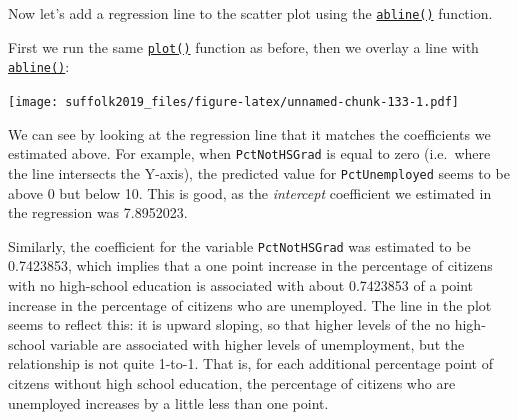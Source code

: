 \documentclass[]{article}
\newenvironment{Shaded}{\begin{snugshade}}{\end{snugshade}}
\newcommand{\DataTypeTok}[1]{\textcolor[rgb]{0.13,0.29,0.53}{#1}}
\newcommand{\DecValTok}[1]{\textcolor[rgb]{0.00,0.00,0.81}{#1}}
\newcommand{\KeywordTok}[1]{\textcolor[rgb]{0.13,0.29,0.53}{\textbf{#1}}}
\newcommand{\NormalTok}[1]{#1}
\newcommand{\OperatorTok}[1]{\textcolor[rgb]{0.81,0.36,0.00}{\textbf{#1}}}
\newcommand{\OtherTok}[1]{\textcolor[rgb]{0.56,0.35,0.01}{#1}}
\newcommand{\StringTok}[1]{\textcolor[rgb]{0.31,0.60,0.02}{#1}}
\begin{document}
Now let's add a regression line to the scatter plot using the \href{http://bit.ly/R_abline}{\texttt{abline()}} function.

First we run the same \href{http://bit.ly/R_plot}{\texttt{plot()}} function as before, then we overlay a line with \href{http://bit.ly/R_abline}{\texttt{abline()}}:

\begin{Shaded}
\end{Shaded}

\texttt{[image: suffolk2019\_files/figure-latex/unnamed-chunk-133-1.pdf]}

We can see by looking at the regression line that it matches the coefficients we estimated above. For example, when \texttt{PctNotHSGrad} is equal to zero (i.e.~where the line intersects the Y-axis), the predicted value for \texttt{PctUnemployed} seems to be above 0 but below 10. This is good, as the \emph{intercept} coefficient we estimated in the regression was 7.8952023.

Similarly, the coefficient for the variable \texttt{PctNotHSGrad} was estimated to be 0.7423853, which implies that a one point increase in the percentage of citizens with no high-school education is associated with about 0.7423853 of a point increase in the percentage of citizens who are unemployed. The line in the plot seems to reflect this: it is upward sloping, so that higher levels of the no high-school variable are associated with higher levels of unemployment, but the relationship is not quite 1-to-1. That is, for each additional percentage point of citzens without high school education, the percentage of citizens who are unemployed increases by a little less than one point.
\end{document}
